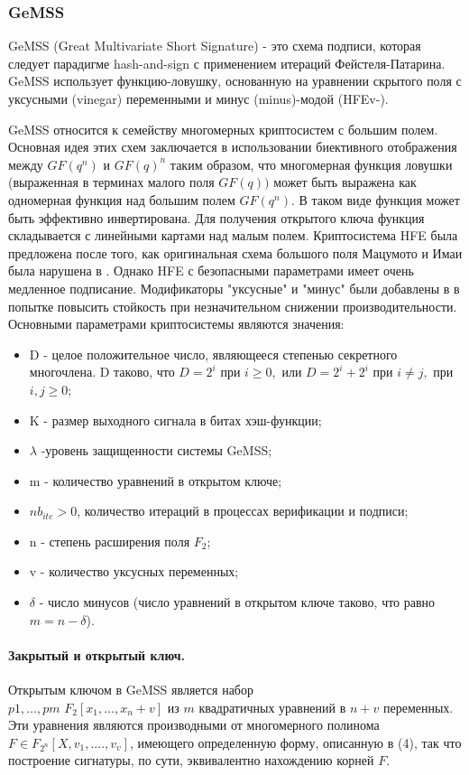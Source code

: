 \subsubsection{GeMSS}
GeMSS (Great Multivariate Short Signature) - это схема подписи, которая следует парадигме hash-and-sign с применением итераций Фейстеля-Патарина. GeMSS использует функцию-ловушку, основанную на уравнении скрытого поля с уксусными (vinegar) переменными и минус (minus)-модой (HFEv-).

GeMSS относится к семейству многомерных криптосистем с большим полем. Основная идея этих схем заключается в использовании биективного отображения между $GF(q^n)$ и $GF(q)^n$ таким образом, что многомерная функция ловушки (выраженная в терминах малого поля $GF(q))$ может быть выражена как одномерная функция над большим полем $GF(q^n)$. В таком виде функция может быть эффективно инвертирована. Для получения открытого ключа функция складывается с линейными картами над малым полем. Криптосистема HFE была предложена после того, как оригинальная схема большого поля Мацумото и Имаи была нарушена в \cite{destroyed-matsuo-imai}. Однако HFE с безопасными параметрами имеет очень медленное подписание. Модификаторы "уксусные" и "минус" были добавлены в \cite{128-bit-long-digital-signatures} в попытке повысить стойкость при незначительном снижении производительности.
Основными параметрами криптосистемы являются значения:
\begin{itemize}
    \item D - целое положительное число, являющееся степенью секретного многочлена. D таково, что $D = 2^i$ при $i \geq 0,$ или $D=2^i+2^i$  при  $i \neq j,$ при $i,j \geq 0$; 
    \item K - размер выходного сигнала в битах хэш-функции;
    \item $\lambda$ -уровень защищенности системы GeMSS;
    \item m - количество уравнений в открытом ключе;
    \item $nb_{ite} > 0$, количество итераций в процессах верификации и подписи;
    \item n - степень расширения поля $F_2$;
    \item v - количество уксусных переменных;
    \item $\delta$ - число минусов (число уравнений в открытом ключе таково, что равно $m = n-\delta$).
\end{itemize}
\paragraph{Закрытый и открытый ключ.} Открытым ключом в GeMSS является набор \\ $p1,\ldots,pm$  $F_2[x_1,\ldots,x_n+v]$ из $m$ квадратичных уравнений в $n + v$ переменных. Эти уравнения являются производными от многомерного полинома $F \in F_{2^n} [X, v_1, . . . . , v_v]$, имеющего определенную форму, описанную в (4), так что построение сигнатуры, по сути, эквивалентно нахождению корней $F$.

